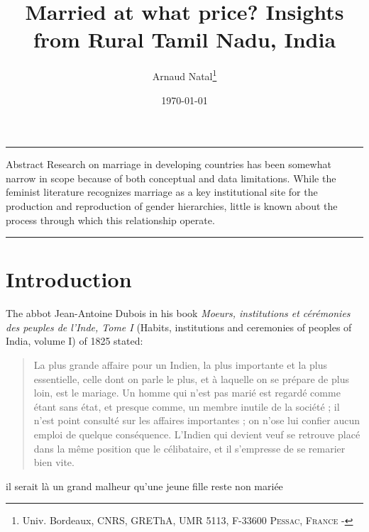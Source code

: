\documentclass[a4paper, 11pt, onecolumn]{article}
\title{Married at what price? Insights from Rural Tamil Nadu, India}
\author{Arnaud Natal\thanks{Univ. Bordeaux, CNRS, GREThA, UMR 5113, F-33600 \textsc{Pessac, France} - \email{arnaud.natal@u-bordeaux.fr}}}
\date{\today}
\begin{document}
\maketitle

\hrule 
\vspace{0.3cm}

\begin{resab}{Abstract}
Research on marriage in developing countries has been somewhat narrow in scope because of both conceptual and data limitations.
While the feminist literature recognizes marriage as a key institutional site for the production and reproduction of gender hierarchies, little is known about the process through which this relationship operate.

\end{resab}

\begin{keywords}

\end{keywords}

\begin{jelcodes}

\end{jelcodes}

\hrule

\clearpage
\newpage
\section{Introduction}
\label{Introduction}

The abbot Jean-Antoine Dubois in his book \textit{Moeurs, institutions et cérémonies des peuples de l'Inde, Tome I} (Habits, institutions and ceremonies of peoples of India, volume I) of 1825 stated:
\begin{quote}
La plus grande affaire pour un Indien, la plus importante et la plus essentielle, celle dont on parle le plus, et à laquelle on se prépare de plus loin, est le mariage.
Un homme qui n’est pas marié est regardé comme étant sans état, et presque comme, un membre inutile de la société ; il n’est point consulté sur les affaires importantes ; on n’ose lui confier aucun emploi de quelque conséquence.
L’Indien qui devient veuf se retrouve placé dans la même position que le célibataire, et il s’empresse de se remarier bien vite.
\end{quote}

\cite{Regnault1891} il serait là un grand malheur qu’une jeune fille reste non mariée
\end{document}
